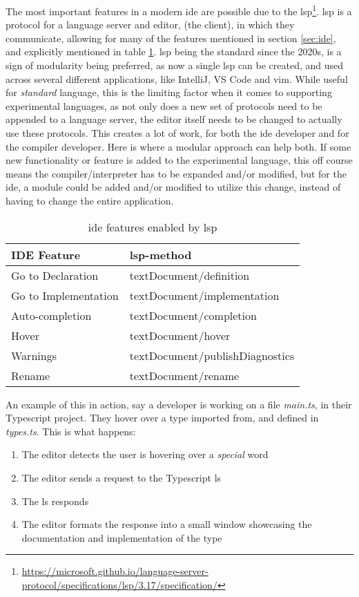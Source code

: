 The most important features in a modern \gls*{ide} are possible due to the
\gls*{lsp}\footnote{\url{https://microsoft.github.io/language-server-protocol/specifications/lsp/3.17/specification/}}.
\gls*{lsp} is a protocol for a language server and editor, (the client), in
which they communicate, allowing for many of the features mentioned in section
\ref{sec:ide}, and explicitly mentioned in table \ref{tbl:ide}. \gls*{lsp} being
the standard since the 2020s, is a sign of modularity being preferred, as now a
single \gls*{lsp} can be created, and used across several different
applications, like IntelliJ, VS Code and \gls*{vim}. While useful for
\textit{standard} language, this is the limiting factor when it comes to
supporting experimental languages, as not only does a new set of protocols need
to be appended to a language server, the editor itself needs to be changed to
actually use these protocols. This creates a lot of work, for both the
\gls*{ide} developer and for the compiler developer. Here is where a modular
approach can help both. If some new functionality or feature is added to the
experimental language, this off course means the compiler/interpreter has to be
expanded and/or modified, but for the \gls*{ide}, a module could be added and/or
modified to utilize this change, instead of having to change the entire
application.

\begin{table}[]
  \centering
  \caption{\gls*{ide} features enabled by \gls*{lsp}}
  \label{tbl:ide}
  \begin{tabular}{|l|l|}
    \hline
    IDE Feature & \gls*{lsp}-method \\ \hline
    Go to Declaration & textDocument/definition \\ \hline
    Go to Implementation & textDocument/implementation \\ \hline
    Auto-completion & textDocument/completion \\ \hline
    Hover & textDocument/hover \\ \hline
    Warnings & textDocument/publishDiagnostics \\ \hline
    Rename & textDocument/rename \\ \hline
  \end{tabular}
\end{table}

An example of this in action, say a developer is working on a file
\textit{main.ts}, in their Typescript project. They hover over a type imported
from, and defined in \textit{types.ts}. This is what happens:

\begin{enumerate}
  \item The editor detects the user is hovering over a \textit{special} word
  \item The editor sends a request to the Typescript \gls*{ls}
  \item The \gls*{ls} responds
  \item The editor formats the response into a small window showcasing the
    documentation and implementation of the type
\end{enumerate}
